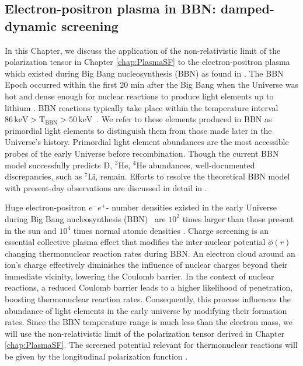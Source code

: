 \subsection{Electron-positron plasma in BBN: damped-dynamic screening}\label{chap:bbn}

In this Chapter, we discuss the application of the non-relativistic limit of the polarization tensor in Chapter \ref{chap:PlasmaSF} to the electron-positron plasma which existed during Big Bang nucleosynthesis (BBN) as found in \cite{Grayson:2023flr}. The BBN Epoch occurred within the first 20 min after the Big Bang when the Universe was hot and dense enough for nuclear reactions to produce light elements up to lithium \cite{Pitrou:2018cgg}. BBN reactions typically take place within the temperature interval $86\, \mathrm{keV}>\mathrm{T_{BBN}}>50\, \mathrm{keV}$~\cite{Pitrou:2018cgg}. We refer to these elements produced in BBN as primordial light elements to distinguish them from those made later in the Universe's history. Primordial light element abundances are the most accessible probes of the early Universe before recombination. Though the current BBN model successfully predicts D, $^3$He, $^4$He abundances, well-documented discrepancies, such as $^7$Li, remain. Efforts to resolve the theoretical BBN model with present-day observations are discussed in detail in \cite{Pitrou:2021vqr,Bertulani:2022qly}.

Huge electron-positron $e^-e^+$- number densities existed in the early Universe during Big Bang nucleosynthesis (BBN)~\cite{Wang:2010px,Hwang:2021kno,Rafelski:2023emw} are $10^2$ times larger than those present in the sun \cite{Bahcall:2001smc} and $10^4$ times normal atomic densities \cite{Grayson:2023flr}. Charge screening is an essential collective plasma effect that modifies the inter-nuclear potential $\phi(r)$ changing thermonuclear reaction rates during BBN. An electron cloud around an ion's charge effectively diminishes the influence of nuclear charges beyond their immediate vicinity, lowering the Coulomb barrier. In the context of nuclear reactions, a reduced Coulomb barrier leads to a higher likelihood of penetration, boosting thermonuclear reaction rates. Consequently, this process influences the abundance of light elements in the early universe by modifying their formation rates. Since the BBN temperature range is much less than the electron mass, we will use the non-relativistic limit of the polarization tensor derived in Chapter \ref{chap:PlasmaSF}. The screened potential relevant for thermonuclear reactions will be given by the longitudinal polarization function .

